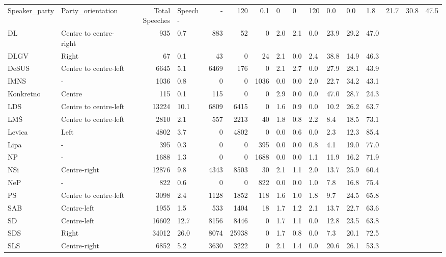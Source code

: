 \begin{tabular}{llrlrrrllllll}
\toprule
Speaker_party & Party_orientation & Total Speeches & Speech %
\midrule
- & - & 120 & 0.1 & 0 & 0 & 120 & 0.0 & 0.0 & 1.8 & 21.7 & 30.8 & 47.5 \\
DL & Centre to centre-right & 935 & 0.7 & 883 & 52 & 0 & 2.0 & 2.1 & 0.0 & 23.9 & 29.2 & 47.0 \\
DLGV & Right & 67 & 0.1 & 43 & 0 & 24 & 2.1 & 0.0 & 2.4 & 38.8 & 14.9 & 46.3 \\
DeSUS & Centre to centre-left & 6645 & 5.1 & 6469 & 176 & 0 & 2.1 & 2.7 & 0.0 & 27.9 & 28.1 & 43.9 \\
IMNS & - & 1036 & 0.8 & 0 & 0 & 1036 & 0.0 & 0.0 & 2.0 & 22.7 & 34.2 & 43.1 \\
Konkretno & Centre & 115 & 0.1 & 115 & 0 & 0 & 2.9 & 0.0 & 0.0 & 47.0 & 28.7 & 24.3 \\
LDS & Centre to centre-left & 13224 & 10.1 & 6809 & 6415 & 0 & 1.6 & 0.9 & 0.0 & 10.2 & 26.2 & 63.7 \\
LMŠ & Centre to centre-left & 2810 & 2.1 & 557 & 2213 & 40 & 1.8 & 0.8 & 2.2 & 8.4 & 18.5 & 73.1 \\
Levica & Left & 4802 & 3.7 & 0 & 4802 & 0 & 0.0 & 0.6 & 0.0 & 2.3 & 12.3 & 85.4 \\
Lipa & - & 395 & 0.3 & 0 & 0 & 395 & 0.0 & 0.0 & 0.8 & 4.1 & 19.0 & 77.0 \\
NP & - & 1688 & 1.3 & 0 & 0 & 1688 & 0.0 & 0.0 & 1.1 & 11.9 & 16.2 & 71.9 \\
NSi & Centre-right & 12876 & 9.8 & 4343 & 8503 & 30 & 2.1 & 1.1 & 2.0 & 13.7 & 25.9 & 60.4 \\
NeP & - & 822 & 0.6 & 0 & 0 & 822 & 0.0 & 0.0 & 1.0 & 7.8 & 16.8 & 75.4 \\
PS & Centre to centre-left & 3098 & 2.4 & 1128 & 1852 & 118 & 1.6 & 1.0 & 1.8 & 9.7 & 24.5 & 65.8 \\
SAB & Centre-left & 1955 & 1.5 & 533 & 1404 & 18 & 1.7 & 1.2 & 2.1 & 13.7 & 22.7 & 63.6 \\
SD & Centre-left & 16602 & 12.7 & 8156 & 8446 & 0 & 1.7 & 1.1 & 0.0 & 12.8 & 23.5 & 63.8 \\
SDS & Right & 34012 & 26.0 & 8074 & 25938 & 0 & 1.7 & 0.8 & 0.0 & 7.3 & 20.1 & 72.5 \\
SLS & Centre-right & 6852 & 5.2 & 3630 & 3222 & 0 & 2.1 & 1.4 & 0.0 & 20.6 & 26.1 & 53.3 \\

\end{tabular}
